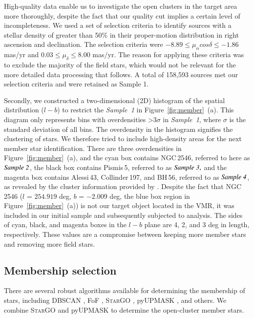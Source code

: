 \documentclass{aa} %
\begin{document}
High-quality data enable us to  investigate the 
open clusters in the target area  more thoroughly, despite the fact that our quality 
cut implies a certain level of incompleteness. We used a set of selection criteria to identify sources with a stellar density of greater than 50$\%$ in their proper-motion distribution in right ascension and declination. The selection criteria were $-8.89\leq {\mu}_{\alpha }cos{\delta } \leq -1.86$ mas/yr and $0.03\leq {\mu}_{\delta } \leq 8.00$ mas/yr. The reason for applying these criteria was to exclude the majority of the field stars, which would not be relevant for the more detailed data processing that follows. A total of 158,593 sources met our selection criteria and were retained as Sample 1. 



Secondly, we constructed a two-dimensional (2D) histogram of the spatial distribution ($l-b$) to restrict
the {\it Sample~1} in Figure~\ref{fig:member}~(a). This diagram only represents bins with 
overdensities >3$\sigma$ in {\it Sample~1}, where $\sigma$ is the standard deviation of all bins.
The overdensity in the histogram signifies the clustering of stars. We therefore tried to include 
high-density areas for the next member star identification. 
There are three overdensities in Figure~\ref{fig:member}~(a), and the cyan box contains NGC\,2546, 
referred to here as {$\it Sample~2 $}, the black box contains Pismis\,5, referred to as {$\it Sample~3, $} and the magenta 
box contains Alessi\,43, Collinder\,197, and BH\,56, referred to as {$\it Sample~4 $}, as revealed by the cluster 
information provided by \citet{2020A&A...633A..99C}. Despite the fact that NGC\,2546 
($l$ = $254.919$ deg, $b$ = $-2.009$ deg, the blue box region in Figure~\ref{fig:member}~(a)) 
is not our target object located in the VMR, it was included in our initial sample and subsequently subjected to analysis. The sides of cyan, black, and magenta boxes in the $l-b$ plane
are 4, 2, and 3 deg in length, respectively. 
These values are a compromise between keeping more member stars and removing more 
field stars.

\subsection{Membership selection} \label{subsec:method}
There are several robust algorithms available for determining the membership of stars, including DBSCAN \citep{Ester1996}, FoF \citep{2019ApJS..245...32L}, \textsc{StarGO} \citep{2018ApJ...863...26Y}, pyUPMASK \citep{2021A&A...650A.109P}, and others. 
We combine \textsc{StarGO} and pyUPMASK to determine the open-cluster member stars.
\end{document}
